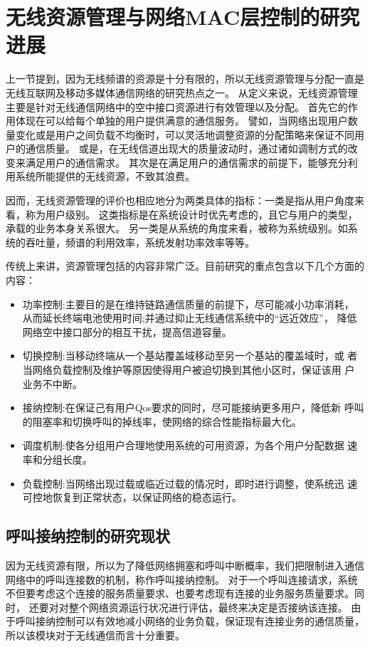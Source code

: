\section{无线资源管理与网络MAC层控制的研究进展}
上一节提到，因为无线频谱的资源是十分有限的，所以无线资源管理与分配一直是无线互联网及移动多媒体通信网络的研究热点之一。
从定义来说，无线资源管理主要是针对无线通信网络中的空中接口资源进行有效管理以及分配。
首先它的作用体现在可以给每个单独的用户提供满意的通信服务。
譬如，当网络出现用户数量变化或是用户之间负载不均衡时，可以灵活地调整资源的分配策略来保证不同用户的通信质量。
或是，在无线信道出现大的质量波动时，通过诸如调制方式的改变来满足用户的通信需求。
其次是在满足用户的通信需求的前提下，能够充分利用系统所能提供的无线资源，不致其浪费。

因而，无线资源管理的评价也相应地分为两类具体的指标：一类是指从用户角度来看，称为用户级别。
这类指标是在系统设计时优先考虑的，且它与用户的类型，承载的业务本身关系很大。
另一类是从系统的角度来看，被称为系统级别。如系统的吞吐量，频谱的利用效率，系统发射功率效率等等。

%
传统上来讲，资源管理包括的内容非常广泛。目前研究的重点包含以下几个方面的内容：

\begin{itemize}
\item 功率控制:主要目的是在维持链路通信质量的前提下，尽可能减小功率消耗，
从而延长终端电池使用时间;并通过抑止无线通信系统中的“远近效应”，
降低网络空中接口部分的相互干扰，提高信道容量。
\item 切换控制:当移动终端从一个基站覆盖域移动至另一个基站的覆盖域时，或
者当网络负载控制及维护等原因使得用户被迫切换到其他小区时，保证该用
户业务不中断。
\item 接纳控制:在保证己有用户Qos要求的同时，尽可能接纳更多用户，降低新
呼叫的阻塞率和切换呼叫的掉线率，使网络的综合性能指标最大化。
\item 调度机制:使各分组用户合理地使用系统的可用资源，为各个用户分配数据
速率和分组长度。
\item 负载控制:当网络出现过载或临近过载的情况时，即时进行调整，使系统迅
速可控地恢复到正常状态，以保证网络的稳态运行。
\end{itemize}

\subsection{呼叫接纳控制的研究现状}
因为无线资源有限，所以为了降低网络拥塞和呼叫中断概率，我们把限制进入通信网络中的呼叫连接数的机制，称作呼叫接纳控制。
对于一个呼叫连接请求，系统不但要考虑这个连接的服务质量要求、也要考虑现有连接的业务服务质量要求。同时，
还要对对整个网络资源运行状况进行评估，最终来决定是否接纳该连接\cite{Ahmed_2005}\cite{Ghaderi_Boutaba_2006}。
由于呼叫接纳控制可以有效地减小网络的业务负载，保证现有连接业务的通信质量，所以该模块对于无线通信而言十分重要。

